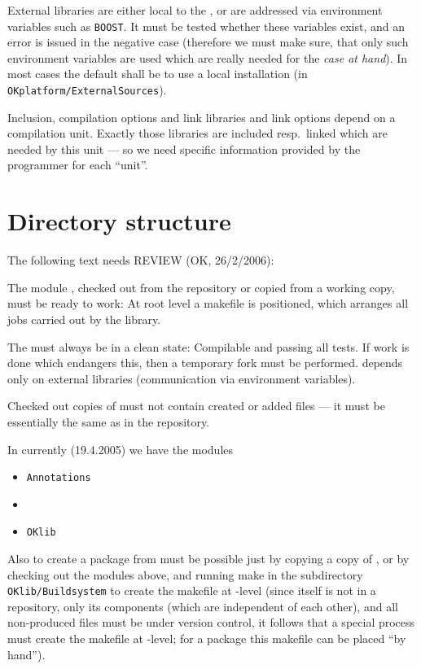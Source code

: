 \documentclass{book}
\newcommand{\name}[1]{\texttt{#1}}
\begin{document}
External libraries are either local to the \OKlibrary, or are addressed via environment variables such as \texttt{BOOST}. It must be tested whether these variables exist, and an error is issued in the negative case (therefore we must make sure, that only such environment variables are used which are really needed for the \emph{case at hand}). In most cases the default shall be to use a local installation (in \name{OKplatform/ExternalSources}).

Inclusion, compilation options and link libraries and link options depend on a compilation unit. Exactly those libraries are included resp.~linked which are needed by this unit --- so we need specific information provided by the programmer for each ``unit''.



\section{Directory structure}
\label{sec:Buildsystemdirectorystructure}

The following text needs REVIEW (OK, 26/2/2006):

The module \OKlibrary{}, checked out from the repository or copied from a working copy, must be ready to work: At root level a makefile is positioned, which arranges all jobs carried out by the library.

The \OKlibrary{} must always be in a clean state: Compilable and passing all tests. If work is done which endangers this, then a temporary fork must be performed. \OKlibrary{} depends only on external libraries (communication via environment variables).

Checked out copies of \OKlibrary{} must not contain created or added files --- it must be essentially the same as in the repository.

In \OKsystem{} currently (19.4.2005) we have the modules
\begin{itemize}
\item \texttt{Annotations}
\item \OKlibrary
\item \texttt{OKlib}
\end{itemize}
Also to create a package from \OKsystem{} must be possible just by copying a copy of \OKsystem, or by checking out the modules above, and running make in the subdirectory \texttt{OKlib/Buildsystem} to create the makefile at \OKsystem-level (since \OKsystem{} itself is not in a repository, only its components (which are independent of each other), and all non-produced files must be under version control, it follows that a special process must create the makefile at \OKsystem-level; for a package this makefile can be placed ``by hand'').
\end{document}
